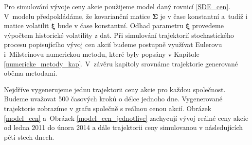 \documentclass[a4paper,12pt]{report}
\theoremstyle{definition} \newtheorem{definice}[veta]{Definice}
\theoremstyle{remark}
\begin{document}

Pro simulování vývoje ceny akcie použijeme model daný rovnicí \eqref{SDE_cen}.
V~modelu předpokládáme, že kovarianční matice $\boldsymbol\Sigma$ je v čase konstantní a~tudíž i matice volatilit $\boldsymbol\xi$ bude v čase konstantní. %
Odhad parametru $\boldsymbol\xi$ provedeme výpočtem historické volatility z dat. 
Při simulování trajektorií stochastického procesu popisujícího vývoj cen akcií budeme postupně využívat Eulerovu i~Milsteinovu numerickou metodu, které byly popsány v Kapitole \ref{numericke_metody_kap}. 
V~závěru kapitoly srovnáme trajektorie generované oběma metodami.

Nejdříve vygenerujeme jednu trajektorii ceny akcie pro každou společnost.
Budeme uvažovat 500 časových kroků o délce jednoho dne.
Vygenerované trajektorie zobrazíme v grafu společně s reálnou cenou akcií.
Obrázek \ref{model_cen} a~Obrázek \ref{model_cen_jednotlive} zachycují vývoj reálné ceny akcie od ledna 2011 do února 2014 a dále trajektorii ceny simulovanou v následujících pěti stech dnech.
\end{document}
